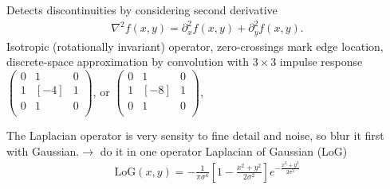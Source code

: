 \begin{compactdesc}
	\item[\lp{Laplacian operator}] Detects discontinuities by considering second derivative
		\begin{gather*}
			\nabla^2 f(x,y)=\partial_{x}^{2}f(x,y)+\partial_{y}^{2}f(x,y).
		\end{gather*}
		Isotropic (rotationally invariant) operator, zero-crossings mark edge location, discrete-space approximation by convolution with $3\times 3$ impulse response
		$\left(\begin{smallmatrix}
			0&1&0\\
			1&[-4]&1\\
			0&1&0\\
		\end{smallmatrix}\right)$, or
		$\left(\begin{smallmatrix}
			0&1&0\\
			1&[-8]&1\\
			0&1&0\\
		\end{smallmatrix}\right)$,
	\item[\lp{Laplacian of Gaussian}]
		The Laplacian operator is very sensity to fine detail and noise, so blur it first with Gaussian.$\to$ do it in one operator Laplacian of Gaussian (LoG)
		\begin{gather*}
			\text{LoG}(x,y)=-\frac{1}{\pi\sigma^4}\left[ 1-\frac{x^2+y^2}{2\sigma^2} \right]e^{-\frac{x^2+y^2}{2\sigma^2}}
		\end{gather*}
\end{compactdesc}
